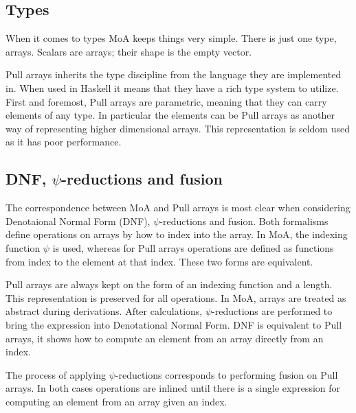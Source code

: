 \documentclass[preprint]{sigplanconf}
\begin{document}
\subsection{Types}
\label{sec:types}

When it comes to types MoA keeps things very simple. There is just one
type, arrays.  Scalars are arrays;  their shape is the empty vector. 


Pull arrays inherits the type discipline from the language they are
implemented in. When used in Haskell it means that they have a rich
type system to utilize. First and foremost, Pull arrays are
parametric, meaning that they can carry elements of any type. In
particular the elements can be Pull arrays as another way of
representing higher dimensional arrays. This representation is seldom
used as it has poor performance.

\subsection{DNF, \(\psi\)-reductions and fusion}
\label{sec:normalization}

The correspondence between MoA and Pull arrays is most clear when
considering Denotaional Normal Form (DNF), \(\psi\)-reductions and
fusion. Both formalisms define operations on arrays by how to index
into the array. In MoA, the indexing function \(\psi\) is used,
whereas for Pull arrays operations are defined as functions from index
to the element at that index. These two forms are equivalent.

Pull arrays are always kept on the form of an indexing function and a
length. This representation is preserved for all operations. In MoA,
arrays are treated as abstract during derivations. After calculations,
\(\psi\)-reductions are performed to bring the expression into
Denotational Normal Form. DNF is equivalent to Pull arrays, it shows
how to compute an element from an array directly from an index.

The process of applying \(\psi\)-reductions corresponds to performing
fusion on Pull arrays. In both cases operations are inlined until
there is a single expression for computing an element from an array
given an index.
\end{document}
